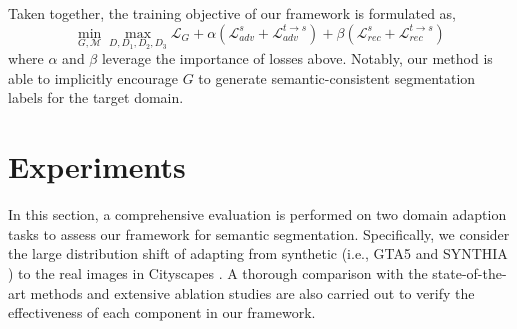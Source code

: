 \documentclass[runningheads]{llncs}
\begin{document}
	Taken together, the training objective of our framework is formulated as,
	\begin{equation} \label{eq:6}
	\min\limits_{G, \mathcal{M}} \max\limits_{D, D_1, D_2, D_3} \mathcal{L}_{G} + \alpha ({\mathcal{L}_{adv}^{s}} + {\mathcal{L}_{adv}^{t{\rightarrow}s}})  + \beta (\mathcal{L}_{rec}^{s} + \mathcal{L}_{rec}^{t{\rightarrow}s})
	\end{equation} 
	where $ \alpha $ and $ \beta $ leverage the importance of losses above. Notably, our method is able to implicitly encourage $ G $ to generate semantic-consistent segmentation labels for the target domain. 
	
	
	\section{Experiments}
	In this section, a comprehensive evaluation is performed on two domain adaption tasks to assess our framework for semantic segmentation. Specifically, we consider the large distribution shift of adapting from synthetic (i.e., GTA5 \cite{richter2016playing} and SYNTHIA \cite{ros2016synthia}) to the real images in Cityscapes \cite{cordts2016cityscapes}. A thorough comparison with the state-of-the-art methods and extensive ablation studies are also carried out to verify the effectiveness of each component in our framework. 
	
\end{document}
